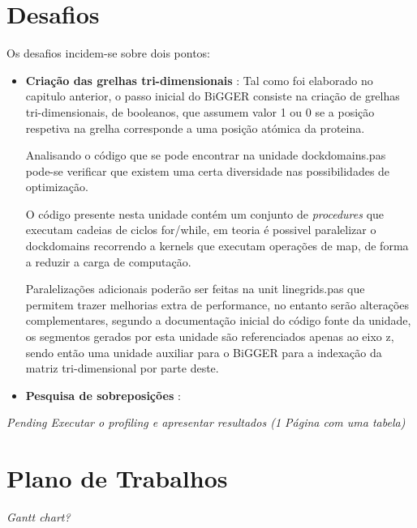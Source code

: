 \section {Desafios}
\label{challenges}
Os desafios incidem-se sobre dois pontos:
\begin{itemize}
\item{\textbf{Criação das grelhas tri-dimensionais}} : 
Tal como foi elaborado no capitulo anterior, o passo inicial do BiGGER consiste na criação de grelhas tri-dimensionais, de booleanos, que assumem valor 1 ou 0 se a posição respetiva na grelha corresponde a uma posição atómica da proteina. 

Analisando o código que se pode encontrar na unidade dockdomains.pas pode-se verificar que existem uma certa diversidade nas possibilidades de optimização.  

O código presente nesta unidade contém um conjunto de \textit{procedures} que executam cadeias de ciclos for/while, em teoria é possivel paralelizar o dockdomains recorrendo a kernels que executam operações de map, de forma a reduzir a carga de computação.

Paralelizações adicionais poderão ser feitas na unit linegrids.pas que permitem trazer melhorias extra de performance, no entanto serão alterações complementares, segundo a documentação inicial do código fonte da unidade, os segmentos gerados por esta unidade são referenciados apenas ao eixo z, sendo então uma unidade auxiliar para o BiGGER para a indexação da matriz tri-dimensional por parte deste.

\item{\textbf{Pesquisa de sobreposições}} : 
\end{itemize}
\textit{Pending Executar o profiling e apresentar resultados (1 Página com uma tabela)}
\section{Plano de Trabalhos} %
\label{sec:dealing_with_bibliogrpahy}
% 
\textit{Gantt chart?}


%
%
%

